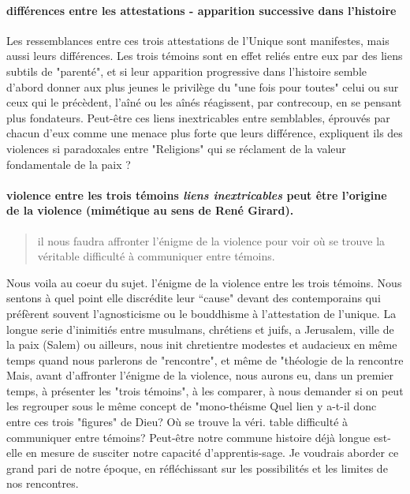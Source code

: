 \paragraph{différences entre les attestations - apparition successive dans l'histoire } 
Les ressemblances entre ces trois attestations de l'Unique sont manifestes, mais aussi leurs différences. Les trois témoins sont en effet reliés entre eux par des liens subtils de "parenté", et si leur apparition progressive dans l'histoire semble  d'abord donner aux plus jeunes le privilège du "une fois pour toutes" celui ou sur ceux qui le précèdent, l'aîné ou les aînés réagissent, par contrecoup, en se pensant plus fondateurs. Peut-être ces liens inextricables entre semblables, éprouvés par chacun d'eux comme une menace plus forte que leurs différence, expliquent ils des violences si paradoxales entre "Religions" qui se réclament de la valeur fondamentale de la paix ?


\paragraph{violence entre les trois témoins \textit{liens inextricables} peut être l'origine de la violence (mimétique au sens de René Girard). } 
\begin{quote}
    il nous faudra affronter l'énigme de la violence pour voir où se trouve la véritable difficulté à communiquer entre témoins. 
\end{quote}

Nous voila au coeur du sujet. l’énigme de la violence entre les trois témoins. Nous sentons à quel point elle discrédite leur “cause" devant des contemporains qui préfèrent souvent l'agnosticisme ou le bouddhisme à l'attestation de l'unique.  La longue serie d'inimitiés entre musulmans, chrétiens et juifs,  a Jerusalem, ville de la paix (Salem) ou ailleurs, nous init chretientre modestes et audacieux en même temps quand nous parlerons de "rencontre", et même de "théologie de la rencontre Mais, avant d'affronter l'énigme de la violence, nous aurons eu, dans un premier temps, à présenter les "trois témoins", à les comparer, à nous demander si on peut les regrouper sous le même concept de "mono-théisme Quel lien y a-t-il donc entre ces trois "figures" de Dieu? Où se trouve la véri. table difficulté à communiquer entre témoins? Peut-être notre commune histoire déjà longue est-elle en mesure de susciter notre capacité d'apprentis-sage. Je voudrais aborder ce grand pari de notre époque, en réfléchissant sur les possibilités et les limites de nos rencontres. 


